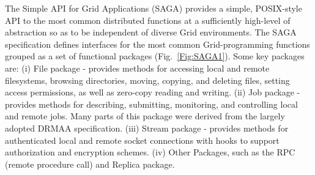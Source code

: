 \documentclass{rspublic}
\begin{document}


The Simple API for Grid Applications (SAGA) provides a simple,
POSIX-style API to the most common distributed functions at a
sufficiently high-level of abstraction so as to be independent of
diverse Grid environments. The SAGA specification defines interfaces
for the most common Grid-programming functions grouped as a set of
functional packages (Fig.~\ref{Fig:SAGA1}). Some key packages are: (i)
File package - provides methods for accessing local and remote
filesystems, browsing directories, moving, copying, and deleting
files, setting access permissions, as well as zero-copy reading and
writing. (ii) Job package - provides methods for describing,
submitting, monitoring, and controlling local and remote jobs. Many
parts of this package were derived from the largely adopted DRMAA
specification. (iii) Stream package - provides methods for
authenticated local and remote socket connections with hooks to
support authorization and encryption schemes. (iv) Other Packages,
such as the RPC (remote procedure call) and Replica package.
\end{document}
